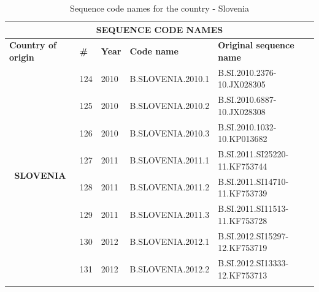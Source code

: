 \begin{table}[htbp]
    \caption{Sequence code names for the country - Slovenia}
    \centering
\begin{tabular}{|cllll|}
\hline
\multicolumn{5}{|c|}{\textbf{SEQUENCE   CODE NAMES}}                                                                                                                                                          \\ \hline
\multicolumn{1}{|l|}{\textbf{Country   of origin}}        & \multicolumn{1}{l|}{\textbf{\#}} & \multicolumn{1}{r|}{\textbf{Year}} & \multicolumn{1}{l|}{\textbf{Code name}} & \textbf{Original sequence name} \\ \hline
\multicolumn{1}{|c|}{\multirow{19}{*}{\textbf{SLOVENIA}}} & \multicolumn{1}{l|}{124}         & \multicolumn{1}{l|}{2010}          & \multicolumn{1}{l|}{B.SLOVENIA.2010.1}  & B.SI.2010.2376-10.JX028305      \\ \cline{2-5} 
\multicolumn{1}{|c|}{}                                    & \multicolumn{1}{l|}{125}         & \multicolumn{1}{l|}{2010}          & \multicolumn{1}{l|}{B.SLOVENIA.2010.2}  & B.SI.2010.6887-10.JX028308      \\ \cline{2-5} 
\multicolumn{1}{|c|}{}                                    & \multicolumn{1}{l|}{126}         & \multicolumn{1}{l|}{2010}          & \multicolumn{1}{l|}{B.SLOVENIA.2010.3}  & B.SI.2010.1032-10.KP013682      \\ \cline{2-5} 
\multicolumn{1}{|c|}{}                                    & \multicolumn{1}{l|}{127}         & \multicolumn{1}{l|}{2011}          & \multicolumn{1}{l|}{B.SLOVENIA.2011.1}  & B.SI.2011.SI25220-11.KF753744   \\ \cline{2-5} 
\multicolumn{1}{|c|}{}                                    & \multicolumn{1}{l|}{128}         & \multicolumn{1}{l|}{2011}          & \multicolumn{1}{l|}{B.SLOVENIA.2011.2}  & B.SI.2011.SI14710-11.KF753739   \\ \cline{2-5} 
\multicolumn{1}{|c|}{}                                    & \multicolumn{1}{l|}{129}         & \multicolumn{1}{l|}{2011}          & \multicolumn{1}{l|}{B.SLOVENIA.2011.3}  & B.SI.2011.SI11513-11.KF753728   \\ \cline{2-5} 
\multicolumn{1}{|c|}{}                                    & \multicolumn{1}{l|}{130}         & \multicolumn{1}{l|}{2012}          & \multicolumn{1}{l|}{B.SLOVENIA.2012.1}  & B.SI.2012.SI15297-12.KF753719   \\ \cline{2-5} 
\multicolumn{1}{|c|}{}                                    & \multicolumn{1}{l|}{131}         & \multicolumn{1}{l|}{2012}          & \multicolumn{1}{l|}{B.SLOVENIA.2012.2}  & B.SI.2012.SI13333-12.KF753713   \\ \cline{2-5} 

\end{tabular}
\end{table}
